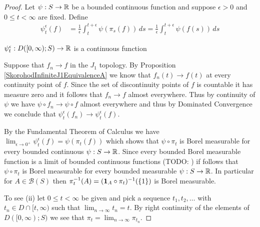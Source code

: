\begin{proof}
Let $\psi : S \to \mathbb{R}$ be a bounded continuous function and suppose $\epsilon > 0$ and $0 \leq t < \infty$ are fixed.  Define
\begin{align*}
\psi^\epsilon_t(f) &= \frac{1}{\epsilon} \int_t^{t + \epsilon} \psi(\pi_s(f)) \, ds = \frac{1}{\epsilon} \int_t^{t + \epsilon} \psi(f(s)) \, ds
\end{align*}

\begin{clm}$\psi^\epsilon_t : D([0,\infty); S) \to \mathbb{R}$ is a continuous function 
\end{clm}
Suppose that $f_n \to f$ in the $J_1$ topology.  By Proposition \ref{SkorohodInfiniteJ1EquivalenceA} we know that $f_n(t) \to f(t)$ at every continuity point of $f$.  Since the set of discontinuity points of $f$ is countable it has measure zero and it follows that $f_n \to f$ almost everywhere.  Thus by continuity of $\psi$ we have $\psi \circ f_n \to \psi \circ f$ almost everywhere and thus by Dominated Convergence we conclude that $\psi^\epsilon_t (f_n) \to \psi^\epsilon_t (f)$.  

By the Fundamental Theorem of Calculus we have $\lim_{\epsilon \to 0^+} \psi^\epsilon_t(f) = \psi(\pi_t(f))$ which shows that $\psi \circ \pi_t$ is Borel measurable for every bounded
continuous $\psi : S \to \mathbb{R}$.  Since every bounded Borel measurable function is a limit of bounded continuous functions (TODO: ) if follows that $\psi \circ \pi_t$ is 
Borel measurable for every bounded measurable $\psi : S \to \mathbb{R}$.  In particular for $A \in \mathcal{B}(S)$ then $\pi_t^{-1}(A) = (\textbf{1}_{A} \circ \pi_t)^{-1}(\lbrace 1 \rbrace)$ is Borel measurable.

To see (ii) let $0 \leq t < \infty$ be given and pick a sequence $t_1, t_2, \dotsc$ with $t_n \in D \cap [t,\infty)$ such that $\lim_{n \to \infty} t_n = t$.  By right continuity of the elements
of $D([0,\infty); S)$ we see that $\pi_t = \lim_{n \to \infty} \pi_{t_n}$.


\end{proof}
